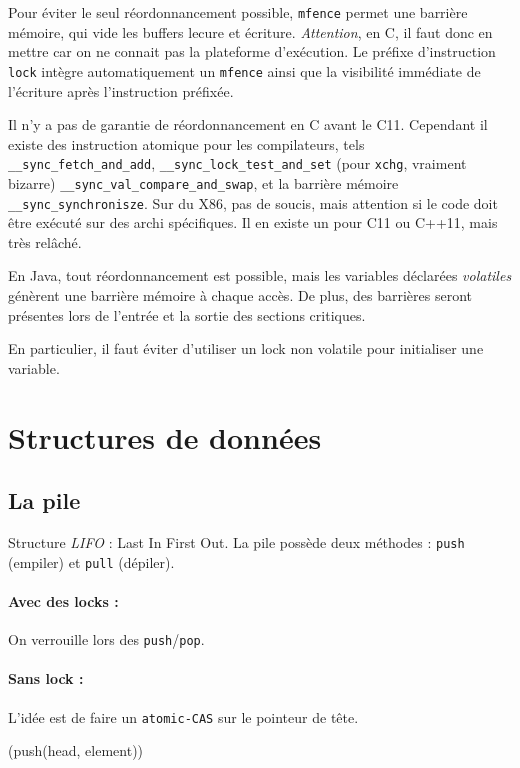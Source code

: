 \documentclass{article}
\begin{document}
Pour éviter le seul réordonnancement possible, \texttt{mfence} permet une barrière mémoire, qui vide les buffers lecure et écriture. \emph{Attention}, en C, il faut donc en mettre car on ne connait pas la plateforme d'exécution. Le préfixe d'instruction \texttt{lock} intègre automatiquement un \texttt{mfence} ainsi que la visibilité immédiate de l'écriture après l'instruction préfixée.
\bigskip


Il n'y a pas de garantie de réordonnancement en C avant le C11. Cependant il existe des instruction atomique pour les compilateurs, tels \texttt{\_\_sync\_fetch\_and\_add}, \texttt{\_\_sync\_lock\_test\_and\_set} (pour \texttt{xchg}, vraiment bizarre) \texttt{\_\_sync\_val\_compare\_and\_swap}, et la barrière mémoire \texttt{\_\_sync\_synchronisze}. Sur du X86, pas de soucis, mais attention si le code doit être exécuté sur des archi spécifiques. Il en existe un pour C11 ou C++11, mais très relâché.
\bigskip


En Java, tout réordonnancement est possible, mais les variables déclarées \emph{volatiles} génèrent une barrière mémoire à chaque accès. De plus, des barrières seront présentes lors de l'entrée et la sortie des sections critiques.
\bigskip

En particulier, il faut éviter d'utiliser un lock non volatile pour initialiser une variable.

\section{Structures de données}
\subsection{La pile}
Structure \emph{LIFO} : Last In First Out. La pile possède deux méthodes : \texttt{push} (empiler) et \texttt{pull} (dépiler).

\paragraph{Avec des locks :} On verrouille lors des \texttt{push}/\texttt{pop}.

\paragraph{Sans lock :} L'idée est de faire un \texttt{atomic-CAS} sur le pointeur de tête.

\begin{algorithm}[H]
\Void({push(head, element)}){
}
\end{algorithm}
\end{document}
